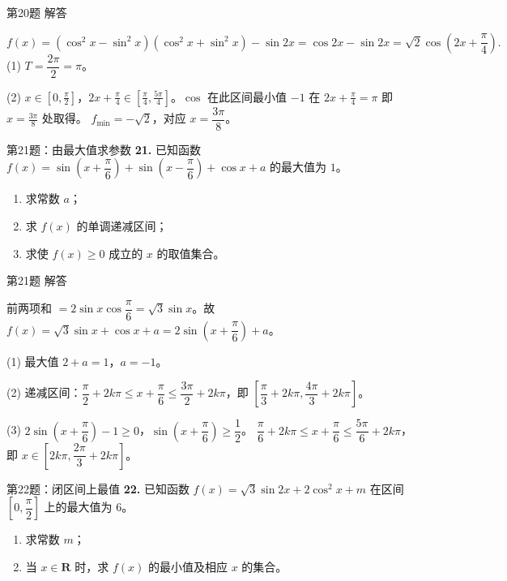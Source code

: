 \documentclass[10pt,aspectratio=169,serif]{beamer}
\begin{document}
\begin{frame}[t]{第20题 解答}
\begin{tcolorbox}[colback=orange!10,colframe=orange,title=\textbf{解}]
\[
f(x)=(\cos^2 x-\sin^2 x)(\cos^2 x+\sin^2 x)-\sin 2x=\cos 2x-\sin 2x=\sqrt2\cos\!\left(2x+\frac{\pi}{4}\right).
\]
(1) $T=\dfrac{2\pi}{2}=\pi$。

(2) $x\in[0,\frac{\pi}{2}]$，$2x+\frac{\pi}{4}\in[\frac{\pi}{4},\frac{5\pi}{4}]$。$\cos$ 在此区间最小值 $-1$ 在 $2x+\frac{\pi}{4}=\pi$ 即 $x=\frac{3\pi}{8}$ 处取得。
$f_{\min}=-\sqrt2$，对应 $x=\dfrac{3\pi}{8}$。
\end{tcolorbox}
\end{frame}

\begin{frame}[t]{第21题：由最大值求参数}
\textbf{21.} 已知函数 $f(x)=\sin\!\left(x+\dfrac{\pi}{6}\right)+\sin\!\left(x-\dfrac{\pi}{6}\right)+\cos x+a$ 的最大值为 $1$。
\begin{enumerate}
  \item 求常数 $a$；
  \item 求 $f(x)$ 的单调递减区间；
  \item 求使 $f(x)\ge 0$ 成立的 $x$ 的取值集合。
\end{enumerate}
\end{frame}

\begin{frame}[t]{第21题 解答}
\begin{tcolorbox}[colback=orange!10,colframe=orange,title=\textbf{解}]
前两项和 $=2\sin x\cos\dfrac{\pi}{6}=\sqrt3\sin x$。故 $f(x)=\sqrt3\sin x+\cos x+a=2\sin\!\left(x+\dfrac{\pi}{6}\right)+a$。

(1) 最大值 $2+a=1$，$a=-1$。

(2) 递减区间：$\dfrac{\pi}{2}+2k\pi\le x+\dfrac{\pi}{6}\le\dfrac{3\pi}{2}+2k\pi$，即 $\left[\dfrac{\pi}{3}+2k\pi,\dfrac{4\pi}{3}+2k\pi\right]$。

(3) $2\sin(x+\dfrac{\pi}{6})-1\ge 0$，$\sin(x+\dfrac{\pi}{6})\ge\dfrac12$。
$\dfrac{\pi}{6}+2k\pi\le x+\dfrac{\pi}{6}\le\dfrac{5\pi}{6}+2k\pi$，即 $x\in[2k\pi,\dfrac{2\pi}{3}+2k\pi]$。
\end{tcolorbox}
\end{frame}

\begin{frame}[t]{第22题：闭区间上最值}
\textbf{22.} 已知函数 $f(x)=\sqrt3\sin 2x+2\cos^2 x+m$ 在区间 $\left[0,\dfrac{\pi}{2}\right]$ 上的最大值为 $6$。
\begin{enumerate}
  \item 求常数 $m$；
  \item 当 $x\in\mathbf{R}$ 时，求 $f(x)$ 的最小值及相应 $x$ 的集合。
\end{enumerate}
\end{frame}
\end{document}

